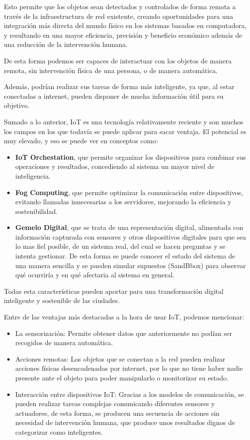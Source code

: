 \documentclass[12pt, a4paper, twoside]{article}
\begin{document}
Esto permite que los objetos sean detectados y controlados de forma remota a través de la  infraestructura de red existente, 
creando oportunidades para una integración más directa del mundo físico en los sistemas basados 
en computadora, y resultando en una mayor eficiencia, precisión y beneficio económico además 
de una reducción de la intervención humana. 

De esta forma podemos ser capaces de interactuar con los objetos de manera remota, sin intervención física de
una persona, o de manera automática.

Además, podrían realizar sus tareas de forma más inteligente, ya que, al estar conectadas a internet, pueden
disponer de mucha información útil para su objetivo.

Sumado a lo anterior, IoT es una tecnología relativamente reciente y son muchos los campos en los que 
todavía se puede aplicar para sacar ventaja. El potencial es muy elevado, y eso se puede ver en
conceptos como:
\begin{itemize}
  \item \textbf{IoT Orchestation}, que permite organizar los dispositivos para combinar sus operaciones
  y resultados, concediendo al sistema un mayor nivel de inteligencia.
  \item \textbf{Fog Computing}, que permite optimizar la comunicación entre dispositivos, evitando llamadas
  innecesarias a los servidores, mejorando la eficiencia y sostenibilidad.
  \item \textbf{Gemelo Digital}, que se trata de una representación digital, alimentada con información
  capturada con sensores y otros dispositivos digitales para que sea lo mas fiel posible, de un
  sistema real, del cual se hacen preguntas y se intenta gestionar.
  De esta forma se puede conocer el estado del sistema de una manera sencilla y se pueden simular supuestos
  (SandBbox) para observar qué ocurriría y en qué afectaria al sistema en general.
\end{itemize}
Todas esta características pueden aportar para una transformación digital inteligente y sostenible de las ciudades.

Entre de las ventajas más destacadas a la hora de usar IoT, podemos mencionar:
\begin{itemize}
    \item La sensorización: Permite obtener datos que anteriormente no podían ser recogidos de manera automática.
    \item Acciones remotas: Los objetos que se conectan a la red pueden realizar acciones físicas desencadenadas por internet,
      por lo que no tiene haber nadie presente ante el objeto para poder manipularlo o monitorizar su estado.
    \item Interacción entre dispositivos IoT: Gracias a los modelos de comunicación, se pueden realizar tareas complejas
      comunicando diferentes sensores y actuadores, de esta forma, se producen una secuencia de acciones sin necesidad
      de intervención humana, que produce unos resultados dignos de categorizar como inteligentes.
\end{itemize}
\end{document}
